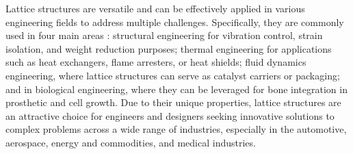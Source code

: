 Lattice structures are versatile and can be effectively applied in various engineering fields to address multiple challenges. Specifically, they are commonly used in four main areas \cite{bhate_classification_2019}: structural engineering for vibration control, strain isolation, and weight reduction purposes; thermal engineering for applications such as heat exchangers, flame arresters, or heat shields; fluid dynamics engineering, where lattice structures can serve as catalyst carriers or packaging; and in biological engineering, where they can be leveraged for bone integration in prosthetic and cell growth. Due to their unique properties, lattice structures are an attractive choice for engineers and designers seeking innovative solutions to complex problems across a wide range of industries, especially in the automotive, aerospace, energy and commodities, and medical industries.
